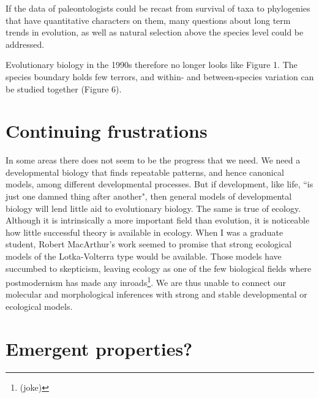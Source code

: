 \documentclass[12pt]{article}
\begin{document}
If the data of paleontologists could be recast from survival of taxa to
phylogenies that have quantitative characters on them, many questions about
long term trends in evolution, as well as natural selection above the species
level could be addressed.

Evolutionary biology in the 1990s therefore no longer looks like Figure 1.
The species boundary holds few terrors, and within- and between-species
variation can be studied together (Figure 6).


\section*{Continuing frustrations}

In some areas there does not seem to be the progress that we need.  We need
a developmental biology that finds repeatable patterns, and hence canonical
models, among different developmental processes.  But if development, like
life, ``is just one damned thing after another", then general models of
developmental biology will lend little aid to evolutionary biology.  The
same is true of ecology.  Although it is intrinsically a more important
field than evolution, it is noticeable how little successful theory is
available in ecology.  When I was a graduate student, Robert MacArthur's
work seemed to promise that strong ecological models of the Lotka-Volterra
type would be available.  Those models have succumbed to skepticism,
leaving ecology as one of the few biological fields where postmodernism
has made any inroads\footnote{(joke)}.   We are thus unable to
connect our molecular and morphological inferences with strong and stable
developmental or ecological models.

\section*{Emergent properties?}
\end{document}
